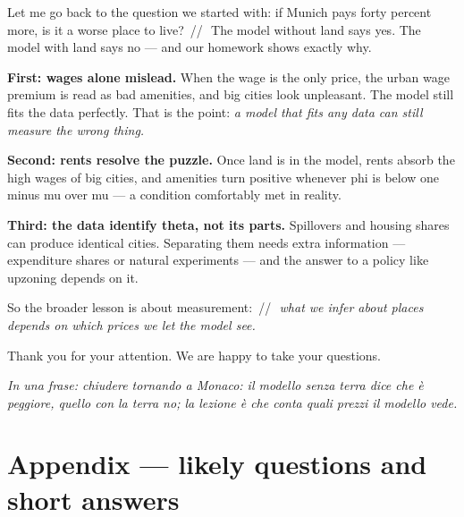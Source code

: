 \documentclass[11pt,a4paper]{article}
\newcommand{\idea}[1]{\par{\small\itshape\color{unicablue}In una frase: #1}\par}
\newcommand{\pause}{\textcolor{unicared}{\,/\!/\,}}
\begin{document}
\begin{say}
Let me go back to the question we started with: if Munich pays forty percent more, is it a worse place to live? \pause\ The model without land says yes. The model with land says no --- and our homework shows exactly why.

\textbf{First: wages alone mislead.} When the wage is the only price, the urban wage premium is read as bad amenities, and big cities look unpleasant. The model still fits the data perfectly. That is the point: \emph{a model that fits any data can still measure the wrong thing.}

\textbf{Second: rents resolve the puzzle.} Once land is in the model, rents absorb the high wages of big cities, and amenities turn positive whenever phi is below one minus mu over mu --- a condition comfortably met in reality.

\textbf{Third: the data identify theta, not its parts.} Spillovers and housing shares can produce identical cities. Separating them needs extra information --- expenditure shares or natural experiments --- and the answer to a policy like upzoning depends on it.

So the broader lesson is about measurement: \pause\ \emph{what we infer about places depends on which prices we let the model see.}

Thank you for your attention. We are happy to take your questions.
\end{say}

\idea{chiudere tornando a Monaco: il modello senza terra dice che è peggiore, quello con la terra no; la lezione è che conta quali prezzi il modello vede.}

\newpage
\section{Appendix --- likely questions and short answers}
\end{document}
